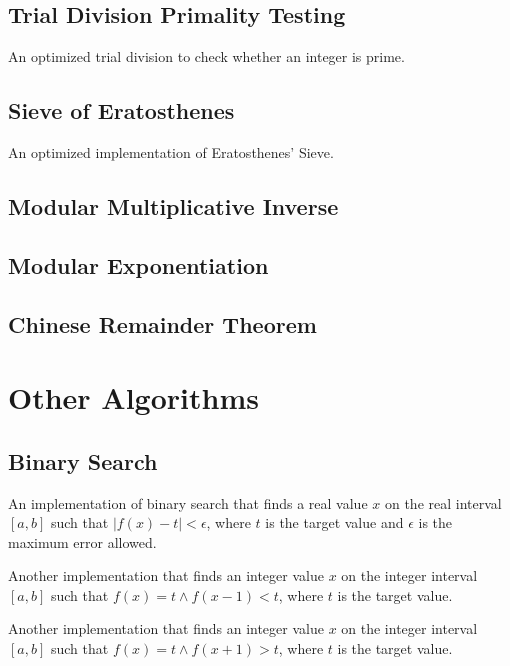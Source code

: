 \documentclass[11pt,a4paper,titlepage]{article}
\begin{document}
		\subsection{Trial Division Primality Testing}
			An optimized trial division to check whether an integer is prime.
			

		\subsection{Sieve of Eratosthenes}
			An optimized implementation of Eratosthenes' Sieve.
			

		\subsection{Modular Multiplicative Inverse}
			

		\subsection{Modular Exponentiation}
			

		\subsection{Chinese Remainder Theorem}
			

	\section{Other Algorithms}
		\subsection{Binary Search}
			An implementation of binary search that finds a real value $x$ on the real interval $[a,b]$ such that $|f(x) - t| < \epsilon$, where $t$ is the target value and $\epsilon$ is the maximum error allowed.
			

			Another implementation that finds an integer value $x$ on the integer interval $[a,b]$ such that $f(x) = t \land f(x - 1) < t$, where $t$ is the target value.
			

			Another implementation that finds an integer value $x$ on the integer interval $[a,b]$ such that $f(x) = t \land f(x + 1) > t$, where $t$ is the target value.
			
\end{document}
